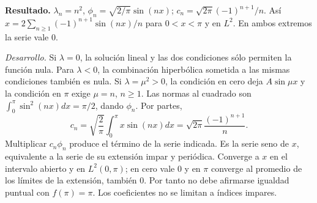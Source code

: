 \noindent\textbf{Resultado.} $\lambda_n=n^2$, $\phi_n=\sqrt{2/\pi}\sin(nx)$; $c_n=\sqrt{2\pi}(-1)^{n+1}/n$. Así $x=2\sum_{n\ge1}(-1)^{n+1}\sin(nx)/n$ para $0<x<\pi$ y en $L^2$. En ambos extremos la serie vale 0.

\noindent\textit{Desarrollo.} Si $\lambda=0$, la solución lineal y las dos condiciones sólo permiten la función nula. Para $\lambda<0$, la combinación hiperbólica sometida a las mismas condiciones también es nula. Si $\lambda=\mu^2>0$, la condición en cero deja $A\sin\mu x$ y la condición en $\pi$ exige $\mu=n$, $n\ge1$. Las normas al cuadrado son $\int_0^\pi\sin^2(nx)dx=\pi/2$, dando $\phi_n$. Por partes,
\[c_n=\sqrt{\frac2\pi}\int_0^\pi x\sin(nx)dx=\sqrt{2\pi}\frac{(-1)^{n+1}}n.\]
Multiplicar $c_n\phi_n$ produce el término de la serie indicada. Es la serie seno de $x$, equivalente a la serie de su extensión impar y periódica. Converge a $x$ en el intervalo abierto y en $L^2(0,\pi)$; en cero vale 0 y en $\pi$ converge al promedio de los límites de la extensión, también 0. Por tanto no debe afirmarse igualdad puntual con $f(\pi)=\pi$. Los coeficientes no se limitan a índices impares.
